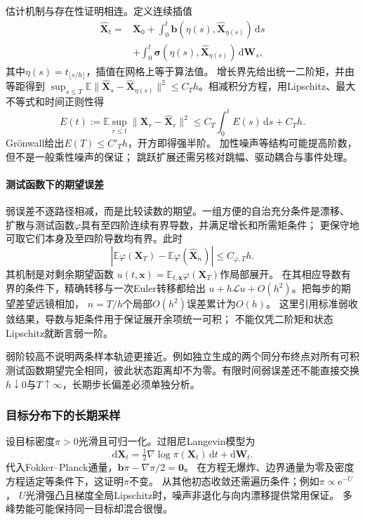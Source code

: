 估计机制与存在性证明相连。定义连续插值
\[
 \begin{split}
 \widehat{\bm X}_t={}&\bm X_0+
    \int_0^t\bm b(\eta(s),\widehat{\bm X}_{\eta(s)})\,\mathrm ds\\
 &+\int_0^t\bm\sigma(\eta(s),\widehat{\bm X}_{\eta(s)})\,\mathrm d\bm W_s,
 \end{split}
\]
其中$\eta(s)=t_{\lfloor s/h\rfloor}$，插值在网格上等于算法值。
增长界先给出统一二阶矩，并由等距得到
$\sup_{s\leq T}\mathbb E\|\widehat{\bm X}_s-\widehat{\bm X}_{\eta(s)}\|^2
\leq C_T h$。相减积分方程，用Lipschitz、最大不等式和时间正则性得
\[
 E(t):=\mathbb E\sup_{r\leq t}\|\bm X_r-\widehat{\bm X}_r\|^2
       \leq C_T\int_0^tE(s)\,\mathrm ds+C_T h.
\]
Grönwall给出$E(T)\leq C'_T h$，开方即得强半阶。
加性噪声等结构可能提高阶数，但不是一般乘性噪声的保证；
跳跃扩展还需另核对跳幅、驱动耦合与事件处理。

\paragraph{测试函数下的期望误差}

弱误差不逐路径相减，而是比较读数的期望。一组方便的自治充分条件是漂移、
扩散与测试函数$\varphi$具有至四阶连续有界导数，并满足增长和所需矩条件；
更保守地可取它们本身及至四阶导数均有界。此时
\[
  |\mathbb E\varphi(\bm X_T)-\mathbb E\varphi(\widehat{\bm X}_n)|
        \leq C_{\varphi,T}h.
\]
其机制是对剩余期望函数
$u(t,\bm x)=\mathbb E_{t,\bm x}\varphi(\bm X_T)$作局部展开。
在其相应导数有界的条件下，精确转移与一次Euler转移都给出
$u+h\mathcal L u+O(h^2)$。把每步的期望差望远镜相加，
$n=T/h$个局部$O(h^2)$误差累计为$O(h)$。
这里引用标准弱收敛结果，导数与矩条件用于保证展开余项统一可积；
不能仅凭二阶矩和状态Lipschitz就断言弱一阶。

弱阶较高不说明两条样本轨迹更接近。例如独立生成的两个同分布终点对所有可积
测试函数期望完全相同，彼此状态距离却不为零。有限时间弱误差还不能直接交换
$h\downarrow0$与$T\uparrow\infty$，长期步长偏差必须单独分析。

\subsubsection{目标分布下的长期采样}

设目标密度$\pi>0$光滑且可归一化。过阻尼Langevin模型为
\begin{equation}
 \mathrm d\bm X_t=\tfrac12\nabla\log\pi(\bm X_t)\,\mathrm dt+\mathrm d\bm W_t.
 \label{eq:dynamical-langevin-sde}
\end{equation}
代入Fokker--Planck通量，$\bm b\pi-\nabla\pi/2=\bm0$。
在方程无爆炸、边界通量为零及密度方程适定等条件下，这证明$\pi$不变。
从其他初态收敛还需遍历条件；例如$\pi\propto\mathrm e^{-U}$，
$U$光滑强凸且梯度全局Lipschitz时，噪声非退化与向内漂移提供常用保证。
多峰势能可能保持同一目标却混合很慢。

